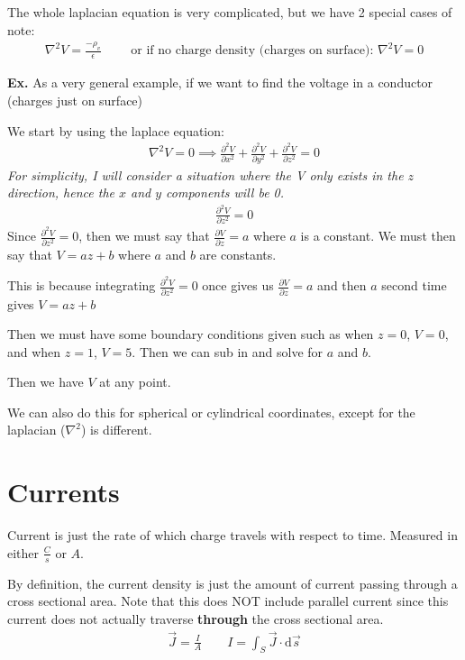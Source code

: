 \documentclass[12pt,letterpaper]{article} \usepackage{amsmath} \usepackage{graphicx} \usepackage[margin=1in]{geometry} \usepackage{longtable}  \usepackage{amssymb}
\begin{document}
	The whole laplacian equation is very complicated, but we have 2 special cases of note:
	\begin{align*}
		\nabla^2 V = \frac{-\rho_v}{\epsilon} \qquad \text{ or if no charge density (charges on surface): } \nabla^2V=0
	\end{align*}

	\begin{mdframed}
		\textbf{Ex. } As a very general example, if we want to find the voltage in a conductor (charges just on surface)
		
		We start by using the laplace equation:
		\begin{align*}
			\nabla^2 V = 0 \implies \frac{\partial^2 V}{\partial x^2} + \frac{\partial^2 V}{\partial y^2} + \frac{\partial^2 V}{\partial z^2} = 0
		\end{align*}
		\textit{For simplicity, I will consider a situation where the V only exists in the $z$ direction, hence the $x$ and $y$ components will be 0.}
		\begin{align*}
			\frac{\partial^2 V}{\partial z^2} = 0
		\end{align*}
		Since $\frac{\partial^2 V}{\partial z^2}=0$, then we must say that $\frac{\partial V}{\partial z} = a$ where $a$ is a constant. We must then say that $V = az+b$ where $a$ and $b$ are constants.
		
		This is because integrating $\frac{\partial^2 V}{\partial z^2}=0$ once gives us $\frac{\partial V}{\partial z}=a$ and then $a$ second time gives $V=az+b$
		
		Then we must have some boundary conditions given such as when $z=0$, $V=0$, and when $z=1$, $V=5$. Then we can sub in and solve for $a$ and $b$.
		
		Then we have $V$ at any point.
	\end{mdframed}

	We can also do this for spherical or cylindrical coordinates, except for the laplacian ($\nabla^2$) is different.
	
	\section{Currents}
	Current is just the rate of which charge travels with respect to time. Measured in either $\frac{C}{s}$ or $A$.
	
	By definition, the current density is just the amount of current passing through a cross sectional area. Note that this does NOT include parallel current since this current does not actually traverse \textbf{through} the cross sectional area.
	\begin{align*}
		\vec J=\frac{I}{A} \qquad I = \int_S \vec J \cdot \mathrm d \vec s
	\end{align*}
\end{document}
